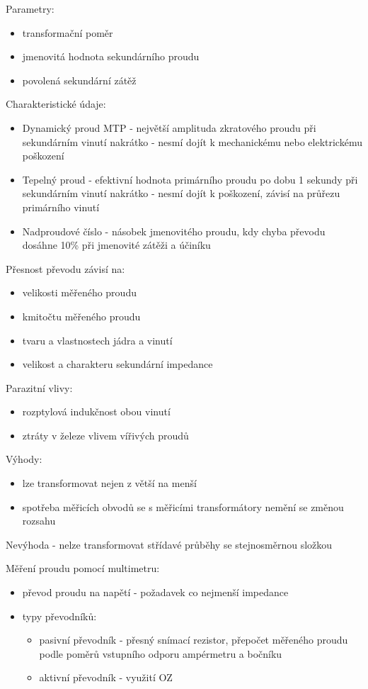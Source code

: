 Parametry:
\begin{itemize}
    \item transformační poměr
    \item jmenovitá hodnota sekundárního proudu
    \item povolená sekundární zátěž 
\end{itemize}
Charakteristické údaje:
\begin{itemize}
    \item Dynamický proud MTP - největší amplituda zkratového proudu při sekundárním vinutí nakrátko - nesmí dojít k mechanickému nebo elektrickému poškození
    \item Tepelný proud - efektivní hodnota primárního proudu po dobu 1 sekundy při sekundárním vinutí nakrátko - nesmí dojít k poškození, závisí na průřezu primárního vinutí
    \item Nadproudové číslo - násobek jmenovitého proudu, kdy chyba převodu dosáhne 10\% při jmenovité zátěži a účiníku
\end{itemize}
Přesnost převodu závisí na:
\begin{itemize}
    \item velikosti měřeného proudu
    \item kmitočtu měřeného proudu 
    \item tvaru a vlastnostech jádra a vinutí 
    \item velikost a charakteru sekundární impedance 
\end{itemize}
Parazitní vlivy:
\begin{itemize}
    \item rozptylová indukčnost obou vinutí 
    \item ztráty v železe vlivem vířivých proudů 
\end{itemize}
\newpage
Výhody:
\begin{itemize}
    \item lze transformovat nejen z větší na menší
    \item spotřeba měřicích obvodů se s měřicími transformátory nemění se změnou rozsahu
\end{itemize}
Nevýhoda - nelze transformovat střídavé průběhy se stejnosměrnou složkou

Měření proudu pomocí multimetru:
\begin{itemize}
    \item převod proudu na napětí - požadavek co nejmenší impedance
    \item typy převodníků:
    \begin{itemize}
        \item pasivní převodník - přesný snímací rezistor, přepočet měřeného proudu podle poměrů vstupního odporu ampérmetru a bočníku
        \item aktivní převodník - využití OZ
    \end{itemize}
\end{itemize}

